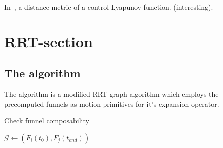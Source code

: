 In~\cite{parkFeedbackMotionPlanning2015}, a distance metric of a
control-Lyapunov function. (interesting).


\section{RRT-section}

\subsection{The \rrtfunnel{} algorithm}

The \rrtfunnel{} algorithm is a modified \ac{RRT} graph algorithm which employs
the precomputed funnels as motion primitives for it's expansion operator.

\begin{algorithm}
  \caption{Check funnel composability}
  \label{alg:create-funnel-graph}
  \DontPrintSemicolon \SetAlgoNoLine

   

   {  {
           { \(\mathcal{G}
            \leftarrow{} \left( F_{i}(t_{0}), F_{j}(t_{end}) \right)\) }
      \; }\; }\;

\end{algorithm}

